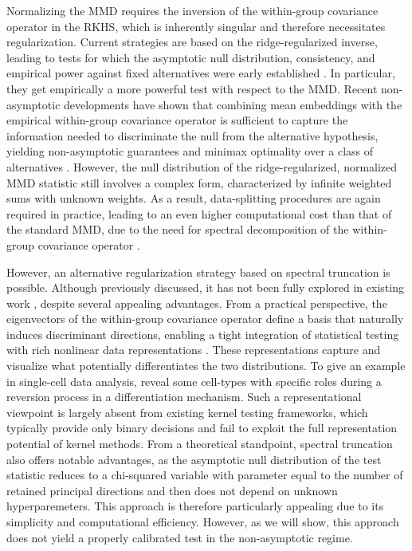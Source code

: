 \documentclass[twoside,11pt]{article}
\begin{document}
Normalizing the MMD requires the inversion of the within-group covariance operator in the RKHS, which is inherently singular and therefore necessitates regularization. Current strategies are based on the ridge-regularized inverse, leading to tests for which the asymptotic null distribution, consistency, and empirical power against fixed alternatives were early established \citep{eric2007testing}. In particular, they get empirically a more powerful test with respect to the MMD. 
Recent non-asymptotic developments have shown that combining mean embeddings with the empirical within-group covariance operator is sufficient to capture the information needed to discriminate the null from the alternative hypothesis, yielding non-asymptotic guarantees and minimax optimality over a class of alternatives \citep{hagrass2024spectral}. However, the null distribution of the ridge-regularized, normalized MMD statistic still involves a complex form, characterized by infinite weighted sums with unknown weights. As a result, data-splitting procedures are again required in practice, leading to an even higher computational cost than that of the standard MMD, due to the need for  spectral decomposition of the within-group covariance operator \citep{hagrass2024spectral}. 

However, an alternative regularization strategy based on spectral truncation is possible. Although previously discussed, it has not been fully explored in existing work \citep{eric2007testing,hagrass2024spectral}, despite several appealing advantages. From a practical perspective, the eigenvectors of the  within-group covariance operator define a basis that naturally induces discriminant directions, enabling a tight integration of statistical testing with rich nonlinear data representations \citep{ozier2024kernel}. These representations capture and visualize what potentially differentiates the two distributions. To give an example in single-cell data analysis, \cite{ozier2024kernel} reveal some cell-types with specific roles during a reversion process in a differentiation mechanism. Such a representational viewpoint is largely absent from existing kernel testing frameworks, which typically provide only binary decisions and fail to exploit the full representation potential of kernel methods. From a theoretical standpoint, spectral truncation also offers notable advantages, as the asymptotic null distribution of the test statistic reduces to a chi-squared variable with parameter equal to the number of retained principal directions and then does not depend on unknown hyperparemeters. This approach is therefore particularly appealing due to its simplicity and computational efficiency. However, as we will show, this approach does not yield a properly calibrated test in the non-asymptotic regime. 
\end{document}
